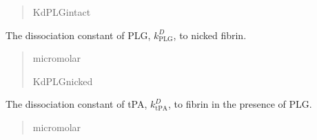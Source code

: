 \documentclass[letterpaper,10pt,english]{sphinxmanual}
\begin{document}
\begin{fulllineitems}
\begin{fulllineitems}
\begin{quote}
\begin{description}
\sphinxAtStartPar
KdPLGintact

\end{description}\end{quote}

\end{fulllineitems}


\begin{fulllineitems}
\label{\detokenize{lysis.util:lysis.util.parameters.MicroParameters.diss_const_PLG_nicked}}
\pysigstartsignatures
{}
\pysigstopsignatures
\sphinxAtStartPar
The dissociation constant of PLG, \(k^D_\text{PLG}\), to nicked fibrin.
\begin{quote}\begin{description}
\sphinxAtStartPar
micromolar

\sphinxAtStartPar
KdPLGnicked

\end{description}\end{quote}

\end{fulllineitems}


\begin{fulllineitems}
\label{\detokenize{lysis.util:lysis.util.parameters.MicroParameters.diss_const_tPA_wPLG}}
\pysigstartsignatures
{}
\pysigstopsignatures
\sphinxAtStartPar
The dissociation constant of tPA, \(k^D_\text{tPA}\), to fibrin
in the presence of PLG.
\begin{quote}\begin{description}
\sphinxAtStartPar
micromolar


\end{description}
\end{quote}
\end{fulllineitems}
\end{fulllineitems}
\end{document}
